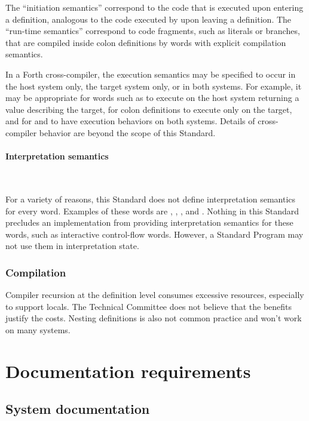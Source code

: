 The ``initiation semantics'' correspond to the code that is executed
upon entering a definition, analogous to the code executed by
 upon leaving a definition. The ``run-time semantics''
correspond to code fragments, such as literals or branches, that are
compiled inside colon definitions by words with explicit compilation
semantics.

In a Forth cross-compiler, the execution semantics may be specified
to occur in the host system only, the target system only, or in both
systems. For example, it may be appropriate for words such as
 to execute on the host system returning a value describing
the target, for colon definitions to execute only on the target, and
for  and  to have execution behaviors on
both systems. Details of cross-compiler behavior are beyond the scope
of this Standard.

\setcounter{paragraph}{1}
\paragraph{Interpretation semantics} ~ %
\label{rat:interpret}

For a variety of reasons, this Standard does not define interpretation
semantics for every word. Examples of these words are ,
, , and . Nothing in this Standard precludes
an implementation from providing interpretation semantics for these
words, such as interactive control-flow words. However, a Standard
Program may not use them in interpretation state.

\addtocounter{subsubsection}{1}
\subsubsection{Compilation} %

Compiler recursion at the definition level consumes excessive
resources, especially to support locals. The Technical Committee
does not believe that the benefits justify the costs. Nesting
definitions is also not common practice and won't work on many
systems.

\section{Documentation requirements} %

\subsection{System documentation} %

